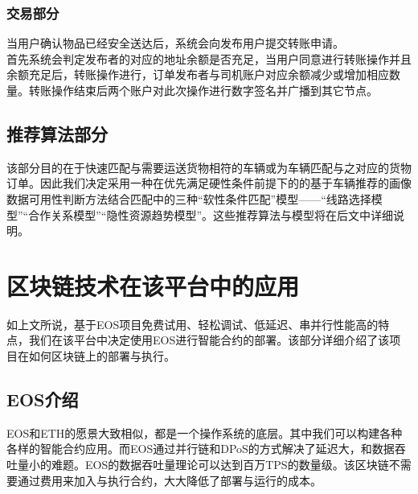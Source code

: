 \documentclass[UTF8]{ctexart}
\begin{document}
\begin{multicols}{2}
  \subsubsection{交易部分}
  当用户确认物品已经安全送达后，系统会向发布用户提交转账申请。\\
  \indent 首先系统会判定发布者的对应的地址余额是否充足，当用户同意进行转账操作并且余额充足后，转账操作进行，订单发布者与司机账户对应余额减少或增加相应数量。转账操作结束后两个账户对此次操作进行数字签名并广播到其它节点。
  \subsection{推荐算法部分}
  该部分目的在于快速匹配与需要运送货物相符的车辆或为车辆匹配与之对应的货物订单。因此我们决定采用一种在优先满足硬性条件前提下的的基于车辆推荐的画像数据可用性判断方法结合匹配中的三种“软性条件匹配”模型\cite{ref3}——“线路选择模型”“合作关系模型”“隐性资源趋势模型”。这些推荐算法与模型将在后文中详细说明。
  \section{区块链技术在该平台中的应用}
  如上文所说，基于EOS项目免费试用、轻松调试、低延迟、串并行性能高的特点，我们在该平台中决定使用EOS进行智能合约的部署。该部分详细介绍了该项目在如何区块链上的部署与执行。
  \subsection{EOS介绍}
  \indent EOS和ETH的愿景大致相似，都是一个操作系统的底层。其中我们可以构建各种各样的智能合约应用。而EOS通过并行链和DPoS的方式解决了延迟大，和数据吞吐量小的难题。EOS的数据吞吐量理论可以达到百万TPS的数量级。该区块链不需要通过费用来加入与执行合约，大大降低了部署与运行的成本。\\

\end{multicols}
\end{document}
